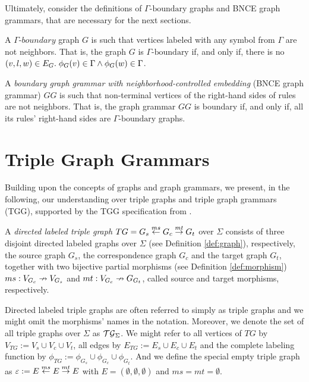 Ultimately, consider the definitions of $\Gamma\text{-boundary}$ graphs and BNCE graph grammars, that are necessary for the next sections.

\begin{definition}
	A $\mathit{\Gamma\textit{-boundary}}$ graph $G$ is such that vertices labeled with any symbol from $\Gamma$ are not neighbors. That is, the graph $G$ is $\Gamma\text{-boundary}$ if, and only if, there is no $(v,l,w) \in E_G \. \phi_G(v) \in \Gamma \land \phi_G(w) \in \Gamma$.
\end{definition}

\begin{definition}
	A \emph{boundary graph grammar with neighborhood-controlled embedding} (BNCE graph grammar) $GG$ is such that non-terminal vertices of the right-hand sides of rules are not neighbors. That is, the graph grammar $GG$ is boundary if, and only if, all its rules' right-hand sides are $\Gamma\text{-boundary}$ graphs.
\end{definition}	

\section{Triple Graph Grammars}
Building upon the concepts of graphs and graph grammars, we present, in the following, our understanding over triple graphs and triple graph grammars (TGG), supported by the TGG specification from \cite{schurr1994specification}.

\begin{definition}
	A \emph{directed labeled triple graph} $TG = G_s \ms{ms} G_c \mt{mt} G_t$ over $\Sigma$ consists of three disjoint directed labeled graphs over $\Sigma$ (see Definition \ref{def:graph}), respectively, the source graph $G_s$, the correspondence graph $G_c$ and the target graph $G_t$, together with two bijective partial morphisms (see Definition \ref{def:morphism}) $ms: V_{G_c} \pto V_{G_s}$ and $mt : V_{G_c} \pto G_{G_t}$, called source and target morphisms, respectively. 
\end{definition}

Directed labeled triple graphs are often referred to simply as triple graphs and we might omit the morphisms' names in the notation. Moreover, we denote the set of all triple graphs over $\Sigma$ as $\alltgraphs{\Sigma}$. We might refer to all vertices of $TG$ by $V_{TG}:= V_s \cup V_c \cup V_t$, all edges by $E_{TG}:= E_s \cup E_c \cup E_t$ and the complete labeling function by $\phi_{TG}:= \phi_{G_s} \cup \phi_{G_c} \cup \phi_{G_t}$. And we define the special empty triple graph as $\emptyTG := E \ms{ms} E \mt{mt} E$ with $E = (\emptyset, \emptyset, \emptyset)$ and $ms = mt = \emptyset$.

